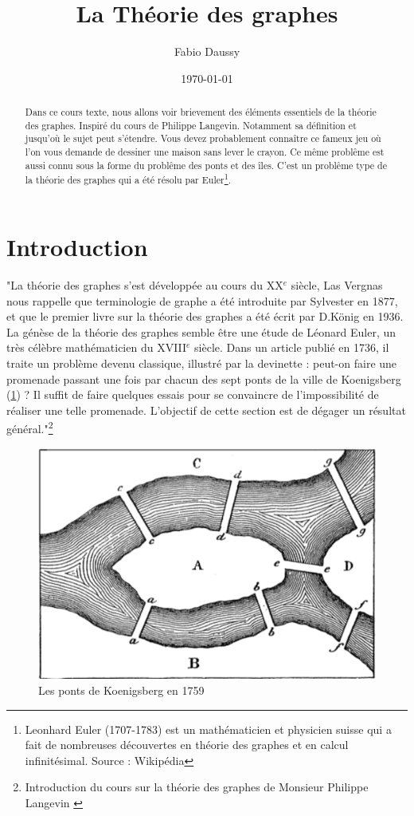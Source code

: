 \documentclass[12pt,a4paper]{scrartcl}
\title{La Théorie des graphes}
\author{Fabio Daussy}
\date{\today}
\theoremstyle{plain}
\theoremstyle{remark}
\begin{document}
\maketitle

\begin{abstract}
Dans ce cours texte, nous allons voir brievement des éléments essentiels de la théorie des graphes. Inspiré du cours de Philippe Langevin.
Notamment sa définition et jusqu'où le sujet peut s'étendre.
Vous devez probablement connaître ce fameux jeu où l'on vous demande de dessiner une maison sans lever le crayon. Ce même problême est aussi connu sous la forme du problême des ponts et des îles. C'est un problême type de la théorie des graphes qui a été résolu par Euler\footnote{Leonhard Euler (1707-1783) est un mathématicien et physicien suisse qui a fait de nombreuses découvertes en théorie des graphes et en calcul infinitésimal. Source : Wikipédia}.
\end{abstract}

\tableofcontents

\section{Introduction}
"La théorie des graphes s’est développée au cours du XX$^e$ siècle,
Las Vergnas nous rappelle que terminologie de graphe a été
introduite par Sylvester en 1877, et que le premier livre sur la théorie
des graphes a été écrit par D.König en 1936. La génèse de la théorie
des graphes semble être une étude de Léonard Euler, un très célèbre
mathématicien du XVIII$^e$ siècle. Dans un article publié en 1736, il traite
un problème devenu classique, illustré par la devinette : peut-on faire
une promenade passant une fois par chacun des sept ponts de la ville
de Koenigsberg (\ref{g.koen}) ? Il suffit de faire quelques essais pour se convaincre
de l’impossibilité de réaliser une telle promenade. L’objectif de cette
section est de dégager un résultat général."\footnote{Introduction du cours sur la théorie des graphes de Monsieur Philippe Langevin \cite{TAG}}

\begin{figure}
	\centering
	\includegraphics[scale=0.25]{pontsiles.png}
	\caption{Les ponts de Koenigsberg en 1759}\label{g.koen}
\end{figure}
\end{document}
